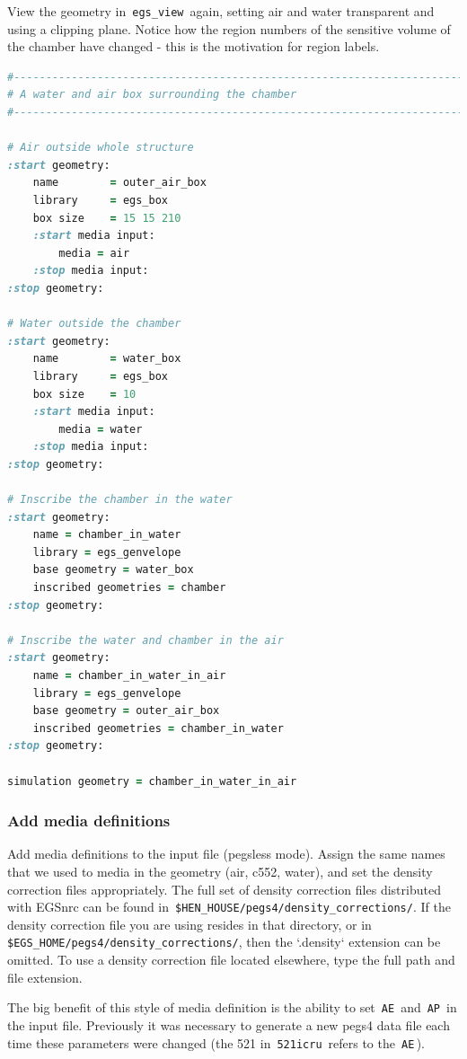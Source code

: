 \documentclass[12pt,twoside]{article}
\begin{document}
View the geometry in \,\Verb|egs_view|\, again, setting air and water
transparent and using a clipping plane. Notice how the region numbers of the
sensitive volume of the chamber have changed - this is the motivation for
region labels.

{\small
\begin{lstlisting}[language=ruby,backgroundcolor=\color{white}]
#-------------------------------------------------------------------------
# A water and air box surrounding the chamber
#-------------------------------------------------------------------------

# Air outside whole structure
:start geometry:
    name        = outer_air_box
    library     = egs_box
    box size    = 15 15 210
    :start media input:
        media = air
    :stop media input:
:stop geometry:

# Water outside the chamber
:start geometry:
    name        = water_box
    library     = egs_box
    box size    = 10
    :start media input:
        media = water
    :stop media input:
:stop geometry:

# Inscribe the chamber in the water
:start geometry:
    name = chamber_in_water
    library = egs_genvelope
    base geometry = water_box
    inscribed geometries = chamber
:stop geometry:

# Inscribe the water and chamber in the air
:start geometry:
    name = chamber_in_water_in_air
    library = egs_genvelope
    base geometry = outer_air_box
    inscribed geometries = chamber_in_water
:stop geometry:

simulation geometry = chamber_in_water_in_air
\end{lstlisting}
}

\subsubsection{Add media definitions}
Add media definitions to the input file (pegsless mode). Assign the same names
that we used to media in the geometry (air, c552, water), and set the density
correction files appropriately. The full set of density correction files
distributed with EGSnrc
can be found in \,\Verb|$HEN_HOUSE/pegs4/density_corrections/|. If the
density correction file you are using resides in that directory, or in
\,\Verb|$EGS_HOME/pegs4/density_corrections/|, then the `.density` extension
can be omitted. To use a density correction file located elsewhere, type
the full path and file extension.

The big benefit of this style of media definition is the ability to set
\,\Verb|AE|\, and \,\Verb|AP|\, in the input file. Previously it was necessary
to generate a new pegs4 data file each time these parameters were changed
(the 521 in \,\Verb|521icru|\, refers to the \,\Verb|AE|\,).
\end{document}
